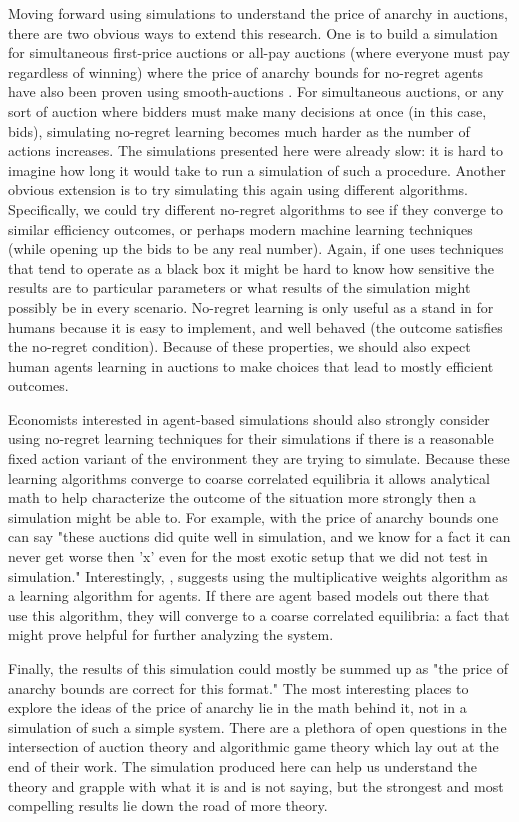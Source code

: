 \documentclass[12pt,twoside]{reedthesis}
\begin{document}
Moving forward using simulations to understand the price of anarchy in auctions, there are two obvious ways to extend this research. One is to build a simulation for simultaneous first-price auctions or all-pay auctions (where everyone must pay regardless of winning) where the price of anarchy bounds for no-regret agents have also been proven using smooth-auctions \citep{Roughgarden2017}. For simultaneous auctions, or any sort of auction where bidders must make many decisions at once (in this case, bids), simulating no-regret learning becomes much harder as the number of actions increases. The simulations presented here were already slow: it is hard to imagine how long it would take to run a simulation of such a procedure. Another obvious extension is to try simulating this again using different algorithms. Specifically, we could try different no-regret algorithms to see if they converge to similar efficiency outcomes, or perhaps modern machine learning techniques (while opening up the bids to be any real number). Again, if one uses techniques that tend to operate as a black box it might be hard to know how sensitive the results are to particular parameters or what results of the simulation might possibly be in every scenario. No-regret learning is only useful as a stand in for humans because it is easy to implement, and well behaved (the outcome satisfies the no-regret condition). Because of these properties, we should also expect human agents learning in auctions to make choices that lead to mostly efficient outcomes. 

Economists interested in agent-based simulations should also strongly consider using no-regret learning techniques for their simulations if there is a reasonable fixed action variant of the environment they are trying to simulate. Because these learning algorithms converge to coarse correlated equilibria it allows analytical math to help characterize the outcome of the situation more strongly then a simulation might be able to. For example, with the price of anarchy bounds one can say "these auctions did quite well in simulation, and we know for a fact it can never get worse then 'x' even for the most exotic setup that we did not test in simulation." Interestingly, \cite{Arthur1991}, suggests using the multiplicative weights algorithm as a learning algorithm for agents. If there are agent based models out there that use this algorithm, they will converge to a coarse correlated equilibria: a fact that might prove helpful for further analyzing the system.

Finally, the results of this simulation could mostly be summed up as "the price of anarchy bounds are correct for this format." The most interesting places to explore the ideas of the price of anarchy lie in the math behind it, not in a simulation of such a simple system. There are a plethora of open questions in the intersection of auction theory and algorithmic game theory which \cite{Roughgarden2017} lay out at the end of their work. The simulation produced here can help us understand the theory and grapple with what it is and is not saying, but the strongest and most compelling results lie down the road of more theory.
\end{document}
